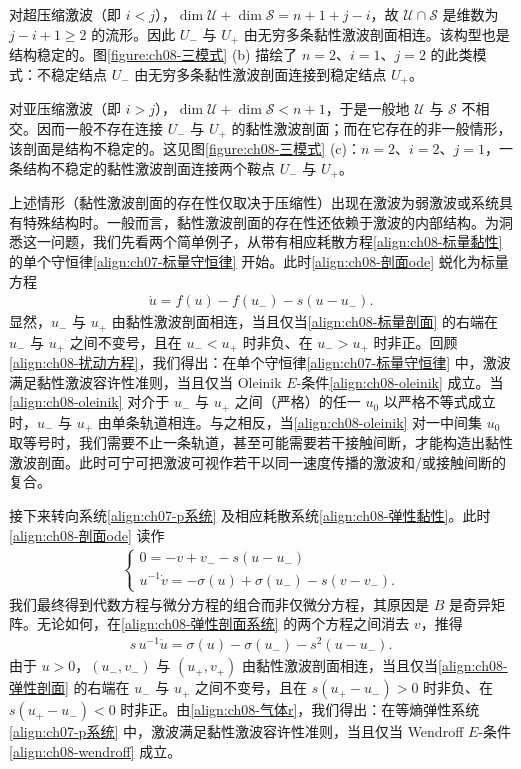 \documentclass[../../main.tex]{subfiles}
\begin{document}
对超压缩激波（即 $i<j$），$\dim\mathscr U+\dim\mathscr S=n+1+j-i$，故 $\mathscr U\cap\mathscr S$ 是维数为 $j-i+1\geqslant2$ 的流形。因此 $U_-$ 与 $U_+$ 由无穷多条黏性激波剖面相连。该构型也是结构稳定的。图\ref{figure:ch08-三模式} (b) 描绘了 $n=2$、$i=1$、$j=2$ 的此类模式：不稳定结点 $U_-$ 由无穷多条黏性激波剖面连接到稳定结点 $U_+$。

对亚压缩激波（即 $i>j$），$\dim\mathscr U+\dim\mathscr S<n+1$，于是一般地 $\mathscr U$ 与 $\mathscr S$ 不相交。因而一般不存在连接 $U_-$ 与 $U_+$ 的黏性激波剖面；而在它存在的非一般情形，该剖面是结构不稳定的。这见图\ref{figure:ch08-三模式} (c)：$n=2$、$i=2$、$j=1$，一条结构不稳定的黏性激波剖面连接两个鞍点 $U_-$ 与 $U_+$。

上述情形（黏性激波剖面的存在性仅取决于压缩性）出现在激波为弱激波或系统具有特殊结构时。一般而言，黏性激波剖面的存在性还依赖于激波的内部结构。为洞悉这一问题，我们先看两个简单例子，从带有相应耗散方程\eqref{align:ch08-标量黏性} 的单个守恒律\eqref{align:ch07-标量守恒律} 开始。此时\eqref{align:ch08-剖面ode} 蜕化为标量方程
\begin{align}
\dot u=f(u)-f(u_-)-s(u-u_-).
\label{align:ch08-标量剖面}
\end{align}
显然，$u_-$ 与 $u_+$ 由黏性激波剖面相连，当且仅当\eqref{align:ch08-标量剖面} 的右端在 $u_-$ 与 $u_+$ 之间不变号，且在 $u_-<u_+$ 时非负、在 $u_->u_+$ 时非正。回顾\eqref{align:ch08-扰动方程}，我们得出：在单个守恒律\eqref{align:ch07-标量守恒律} 中，激波满足黏性激波容许性准则，当且仅当 Oleinik $E$-条件\eqref{align:ch08-oleinik} 成立。当\eqref{align:ch08-oleinik} 对介于 $u_-$ 与 $u_+$ 之间（严格）的任一 $u_0$ 以严格不等式成立时，$u_-$ 与 $u_+$ 由单条轨道相连。与之相反，当\eqref{align:ch08-oleinik} 对一中间集 $u_0$ 取等号时，我们需要不止一条轨道，甚至可能需要若干接触间断，才能构造出黏性激波剖面。此时可宁可把激波可视作若干以同一速度传播的激波和/或接触间断的复合。

接下来转向系统\eqref{align:ch07-p系统} 及相应耗散系统\eqref{align:ch08-弹性黏性}。此时\eqref{align:ch08-剖面ode} 读作
\begin{align}
\begin{cases}
0=-v+v_--s(u-u_-)\\
u^{-1}\dot v=-\sigma(u)+\sigma(u_-)-s(v-v_-).
\end{cases}
\label{align:ch08-弹性剖面系统}
\end{align}
我们最终得到代数方程与微分方程的组合而非仅微分方程，其原因是 $B$ 是奇异矩阵。无论如何，在\eqref{align:ch08-弹性剖面系统} 的两个方程之间消去 $v$，推得
\begin{align}
s\,u^{-1}\dot u=\sigma(u)-\sigma(u_-)-s^2(u-u_-).
\label{align:ch08-弹性剖面}
\end{align}
由于 $u>0$，$(u_-,v_-)$ 与 $(u_+,v_+)$ 由黏性激波剖面相连，当且仅当\eqref{align:ch08-弹性剖面} 的右端在 $u_-$ 与 $u_+$ 之间不变号，且在 $s(u_+-u_-)>0$ 时非负、在 $s(u_+-u_-)<0$ 时非正。由\eqref{align:ch08-气体r}，我们得出：在等熵弹性系统\eqref{align:ch07-p系统} 中，激波满足黏性激波容许性准则，当且仅当 Wendroff $E$-条件\eqref{align:ch08-wendroff} 成立。
\end{document}
